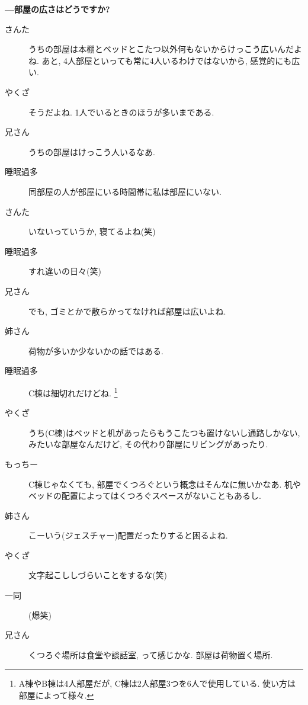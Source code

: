 \documentclass[10pt,b5jsbook,dvips,dvipdfmx,openany]{jsbook}
\theoremstyle{definition}
\begin{document}
\begin{multicols}{2}
		\textbf{---部屋の広さはどうですか? }
		\begin{description}
		\item[さんた]うちの部屋は本棚とベッドとこたつ以外何もないからけっこう広いんだよね. あと, 4人部屋といっても常に4人いるわけではないから, 感覚的にも広い.
		\item[やくざ]そうだよね. 1人でいるときのほうが多いまである.
		\item[兄さん]うちの部屋はけっこう人いるなあ.
		\item[睡眠過多]同部屋の人が部屋にいる時間帯に私は部屋にいない.
		\item[さんた]いないっていうか, 寝てるよね(笑)
		\item[睡眠過多]すれ違いの日々(笑)
		\item[兄さん]でも, ゴミとかで散らかってなければ部屋は広いよね.
		\item[姉さん]荷物が多いか少ないかの話ではある.
		\item[睡眠過多]C棟は細切れだけどね. \footnote{A棟やB棟は4人部屋だが, C棟は2人部屋3つを6人で使用している. 使い方は部屋によって様々. }
		\item[やくざ]うち(C棟)はベッドと机があったらもうこたつも置けないし通路しかない, みたいな部屋なんだけど, その代わり部屋にリビングがあったり.
		\item[もっちー]C棟じゃなくても, 部屋でくつろぐという概念はそんなに無いかなあ. 机やベッドの配置によってはくつろぐスペースがないこともあるし.
		\item[姉さん]こーいう(ジェスチャー)配置だったりすると困るよね.
		\item[やくざ]文字起こししづらいことをするな(笑)
		\item[ 一同 ](爆笑)
		\item[兄さん]くつろぐ場所は食堂や談話室, って感じかな. 部屋は荷物置く場所.
		\end{description}


\end{multicols}
\end{document}
